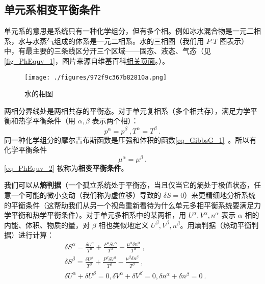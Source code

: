 \subsection{单元系相变平衡条件}
单元系的意思是系统只有一种化学组分，但有多个相。例如冰水混合物是一元二相系，水与水蒸气组成的体系是一元二相系。水的三相图（我们用 $P$-$T$ 图表示）中，有最主要的三条线区分开三个区域——固态、液态、气态（见\autoref{fig_PhEquv_1}，图片来源自维基百科\href{https://en.wikipedia.org/wiki/Triple_point}{相关页面}。）。
\begin{figure}[ht]
\centering
\texttt{[image: ./figures/972f9c367b82810a.png]}
\caption{水的相图} \label{fig_PhEquv_1}
\end{figure}

两相分界线处是两相共存的平衡态。对于单元复相系（多个相共存），满足力学平衡和热学平衡条件（用 $\alpha,\beta$ 表示两个相）：
\begin{equation}\label{eq_PhEquv_1}
p^{\alpha}=p^{\beta}~, 
T^{\alpha}=T^{\beta}~.
\end{equation}
同一种化学组分的摩尔吉布斯函数是压强和体积的函数\autoref{eq_GibbsG_1}~。所以有化学平衡条件
\begin{equation}\label{eq_PhEquv_2}
\mu^{\alpha}=\mu^\beta~.
\end{equation}
\autoref{eq_PhEquv_2} 被称为\textbf{相变平衡条件}。

我们可以从\textbf{熵判据}（一个孤立系统处于平衡态，当且仅当它的熵处于极值状态，任意一个可能的微小变动（我们称为虚位移）导致的 $\delta S=0$）来更精细地分析系统的平衡条件（这帮助我们从另一个视角重新看待为什么单元多相平衡系统要满足力学平衡和热学平衡条件）。对于单元多相系中的某两相，用 $U^\alpha,V^\alpha,n^\alpha$ 表示 $\alpha$ 相的内能、体积、物质的量，对 $\beta$ 相也类似地定义 $U^\beta,V^\beta,n^\beta$。用熵判据（热动平衡判据）进行计算：
\begin{equation}
\begin{aligned}
&\delta S^\alpha=\frac{\delta U^\alpha}{T^\alpha}+\frac{P^\alpha\delta V^\alpha}{T^{\alpha}}-\frac{\mu^\alpha\delta n^\alpha}{T^{\alpha}}~,\\
&\delta S^\beta=\frac{\delta U^\beta}{T^\beta}+\frac{P^\beta\delta V^\beta}{T^{\beta}}-\frac{\mu^\beta\delta n^\beta}{T^{\beta}}~,\\
&\delta U^\alpha+\delta U^\beta=0,\delta V^\alpha+\delta V^\beta=0,\delta n^\alpha+\delta n^\beta=0~.
\end{aligned}
\end{equation}

